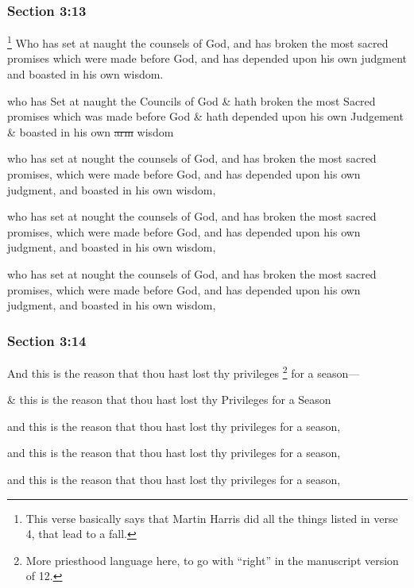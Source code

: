 	\subsubsection{Section 3:13} %
		\label{DC3-13}

			\footnote{%
				This verse basically says that Martin Harris did all the things listed in verse 4, that lead to a fall.
				}%
		Who has set at naught the counsels of God, and has broken the most sacred promises which were made before God, and has depended upon his own judgment and boasted in his own wisdom.

		\begin{framed}
		\scriptsize
			\begin{compactdesc}
				\item[JSP] who has Set at naught the Councils of God \& hath broken the most Sacred promises which was made before God \& hath depended upon his own Judgement \& boasted in his own \sout{arm} wisdom
				\item[BC] who has set at nought the counsels of God, and has broken the most sacred promises, which were made before God, and has depended upon his own judgment, and boasted in his own wisdom,
				\item[DC 1835] who has set at nought the counsels of God, and has broken the most sacred promises, which were made before God, and has depended upon his own judgment, and boasted in his own wisdom,
				\item[DC 1844] who has set at nought the counsels of God, and has broken the most sacred promises, which were made before God, and has depended upon his own judgment, and boasted in his own wisdom,
			\end{compactdesc}
		\end{framed}

	\subsubsection{Section 3:14} %
		\label{DC3-14}

		And this is the reason that thou hast lost thy privileges%
			\footnote{%
				More priesthood language here, to go with ``right'' in the manuscript version of 12.
				}
		for a season---

		\begin{framed}
		\scriptsize
			\begin{compactdesc}
				\item[JSP] \& this is the reason that thou hast lost thy Privileges for a Season
				\item[BC] and this is the reason that thou hast lost thy privileges for a season,
				\item[DC 1835] and this is the reason that thou hast lost thy privileges for a season,
				\item[DC 1844] and this is the reason that thou hast lost thy privileges for a season,
			\end{compactdesc}
		\end{framed}

